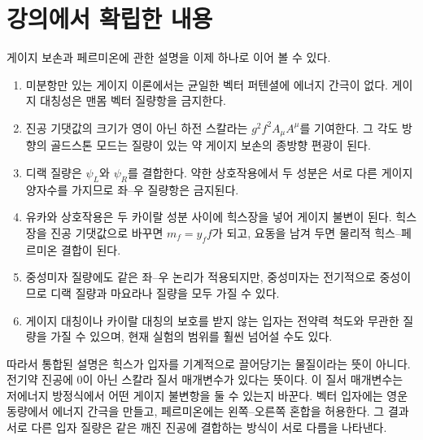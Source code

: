 \begin{classroomqa}
\end{classroomqa}

\section{강의에서 확립한 내용}

게이지 보손과 페르미온에 관한 설명을 이제 하나로 이어 볼 수 있다.

\begin{enumerate}
  \item 미분항만 있는 게이지 이론에서는 균일한 벡터 퍼텐셜에 에너지 간극이 없다. 게이지 대칭성은 맨몸 벡터 질량항을 금지한다.
  \item 진공 기댓값의 크기가 영이 아닌 하전 스칼라는 \(g^2f^2A_\mu A^\mu\)를 기여한다. 그 각도 방향의 골드스톤 모드는 질량이 있는 약 게이지 보손의 종방향 편광이 된다.
  \item 디랙 질량은 \(\psi_L\)와 \(\psi_R\)를 결합한다. 약한 상호작용에서 두 성분은 서로 다른 게이지 양자수를 가지므로 좌--우 질량항은 금지된다.
  \item 유카와 상호작용은 두 카이랄 성분 사이에 힉스장을 넣어 게이지 불변이 된다. 힉스장을 진공 기댓값으로 바꾸면 \(m_f=y_ff\)가 되고, 요동을 남겨 두면 물리적 힉스--페르미온 결합이 된다.
  \item 중성미자 질량에도 같은 좌--우 논리가 적용되지만, 중성미자는 전기적으로 중성이므로 디랙 질량과 마요라나 질량을 모두 가질 수 있다.
  \item 게이지 대칭이나 카이랄 대칭의 보호를 받지 않는 입자는 전약력 척도와 무관한 질량을 가질 수 있으며, 현재 실험의 범위를 훨씬 넘어설 수도 있다.
\end{enumerate}

따라서 통합된 설명은 힉스가 입자를 기계적으로 끌어당기는 물질이라는 뜻이 아니다. 전기약 진공에 0이 아닌 스칼라 질서 매개변수가 있다는 뜻이다. 이 질서 매개변수는 저에너지 방정식에서 어떤 게이지 불변항을 둘 수 있는지 바꾼다. 벡터 입자에는 영운동량에서 에너지 간극을 만들고, 페르미온에는 왼쪽--오른쪽 혼합을 허용한다. 그 결과 서로 다른 입자 질량은 같은 깨진 진공에 결합하는 방식이 서로 다름을 나타낸다.
